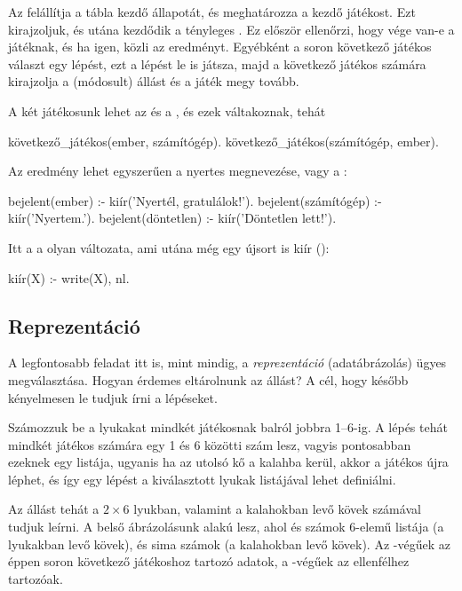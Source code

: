 Az  felállítja a tábla kezdő
állapotát, és meghatározza a kezdő játékost. Ezt
kirajzoljuk, és utána kezdődik a tényleges
. Ez először ellenőrzi, hogy vége van-e
a játéknak, és ha igen, közli az
eredményt. Egyébként a soron következő játékos
választ egy lépést, ezt a lépést le is játsza, majd
a következő játékos számára kirajzolja a (módosult)
állást és a játék megy tovább.

A két játékosunk lehet az  és a
, és ezek váltakoznak, tehát
\begin{program}
következő_játékos(ember, számítógép).
következő_játékos(számítógép, ember).
\end{program}

Az eredmény lehet egyszerűen a nyertes megnevezése,
vagy a :
\begin{program}
bejelent(ember) :- kiír('Nyertél, gratulálok!').
bejelent(számítógép) :- kiír('Nyertem.').
bejelent(döntetlen) :- kiír('Döntetlen lett!').
\end{program}

Itt a  a  olyan változata, ami
utána még egy újsort is kiír ():
\begin{program}
kiír(X) :- write(X), nl.
\end{program}

\subsection*{Reprezentáció}
A legfontosabb feladat itt is, mint mindig, a
\emph{reprezentáció} (adatábrázolás) ügyes
megválasztása. Hogyan érdemes eltárolnunk az állást?
A cél, hogy később kényelmesen le tudjuk írni a
lépéseket.

Számozzuk be a lyukakat mindkét játékosnak balról
jobbra 1--6-ig. A lépés tehát mindkét játékos
számára egy 1 és 6 közötti szám lesz, vagyis
pontosabban ezeknek egy listája, ugyanis ha az
utolsó kő a kalahba kerül, akkor a játékos újra
léphet, és így egy lépést a kiválasztott lyukak
listájával lehet definiálni.

Az állást tehát a $2\times6$ lyukban, valamint a
kalahokban levő kövek számával tudjuk leírni. A
belső ábrázolásunk  alakú
lesz, ahol  és  számok 6-elemű listája
(a lyukakban levő kövek),  és  sima
számok (a kalahokban levő kövek). Az -végűek
az éppen soron következő játékoshoz tartozó adatok,
a -végűek az ellenfélhez tartozóak.

